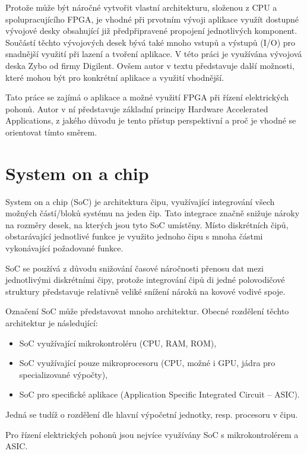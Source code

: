 \documentclass[a4paper, twoside, 11pt]{article}
\begin{document}
Protože může být náročné vytvořit vlastní architekturu, složenou z CPU a spolupracujícího FPGA, je vhodné při prvotním vývoji aplikace využít dostupné vývojové desky obsahující již předpřipravené propojení jednotlivých komponent. Součástí těchto vývojových desek bývá také mnoho vstupů a výstupů (I/O) pro snadnější využití při lazení a tvoření aplikace. V této práci je využívána vývojová deska Zybo od firmy Digilent. Ovšem autor v textu představuje další možnosti, které mohou být pro konkrétní aplikace a využití vhodnější.\par
Tato práce se zajímá o aplikace a možné využití FPGA při řízení elektrických pohonů. Autor v ní představuje základní principy Hardware Accelerated Applications, z jakého důvodu je tento přístup perspektivní a proč je vhodné se orientovat tímto směrem.\par
\flushbottom %
\newpage

	\section{System on a chip}
	System on a chip (SoC) je architektura čipu, využívající integrování všech možných částí/bloků systému na jeden čip. Tato integrace značně snižuje nároky na rozměry desek, na kterých jsou tyto SoC umístěny. Místo diskrétních čipů, obstarávající jednotlivé funkce je využito jednoho čipu s mnoha částmi vykonávající požadované funkce.\par
	SoC se používá z důvodu snižování časové náročnosti přenosu dat mezi jednotlivými diskrétními čipy, protože integrování čipů di jedné polovodičové struktury představuje relativně veliké snížení nároků na kovové vodivé spoje.\par
	Označení SoC může představovat mnoho architektur. Obecné rozdělení těchto architektur je následující:
	\begin{itemize}
		\item SoC využívající mikrokontroléru (CPU, RAM, ROM),
		\item SoC využívající pouze mikroprocesoru (CPU, možné i GPU, jádra pro specializované výpočty),
		\item SoC pro specifické aplikace (Application Specific Integrated Circuit – ASIC).
	\end{itemize}
	Jedná se tudíž o rozdělení dle hlavní výpočetní jednotky, resp. procesoru v čipu.\par
	Pro řízení elektrických pohonů jsou nejvíce využívány SoC s mikrokontrolérem a ASIC.
\end{document}
